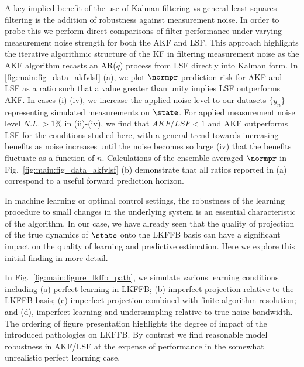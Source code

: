 {A key implied benefit of the use of Kalman filtering vs general least-squares filtering is the addition of robustness against measurement noise.  In order to probe this we perform direct comparisons of filter performance under varying measurement noise strength for both the AKF and LSF.  This approach highlights the iterative algorithmic structure of the KF in filtering measurement noise as the AKF algorithm recasts an AR($q$) process from LSF directly into Kalman form.  In \cref{fig:main:fig_data_akfvlsf} (a), we plot $\normpr$ prediction risk for AKF and LSF as a ratio such that a value greater than unity implies LSF outperforms AKF.
In cases (i)-(iv), we increase the applied noise level to our datasets $\{ y_n \}$ representing simulated measurements on $\state$. For applied measurement noise level $N.L. > 1\%$ in (ii)-(iv), we find that $AKF/LSF <1 $ and AKF outperforms LSF for the conditions studied here, with a general trend towards increasing benefits as noise increases until the noise becomes so large (iv) that the benefits fluctuate as a function of $n$. Calculations of the ensemble-averaged $\normpr$ in Fig.~\ref{fig:main:fig_data_akfvlsf} (b) demonstrate that all ratios reported in (a) correspond to a useful forward prediction horizon. 





In machine learning or optimal control settings, the robustness of the learning procedure to small changes in the underlying system is an essential characteristic of the algorithm.  In our case, we have already seen that the quality of projection of the true dynamics of $\state$ onto the LKFFB basis can have a significant impact on the quality of learning and predictive estimation.  Here we explore this initial finding in more detail.  

 In Fig.~\ref{fig:main:figure_lkffb_path}, we simulate various learning conditions including (a) perfect learning in LKFFB; (b) imperfect projection relative to the LKFFB basis; (c) imperfect projection combined with finite algorithm resolution; and (d), imperfect learning and undersampling relative to true noise bandwidth. The ordering of figure presentation highlights the degree of impact of the introduced pathologies on LKFFB.  By contrast we find reasonable model robustness in AKF/LSF at the expense of performance in the somewhat unrealistic perfect learning case.  

}
